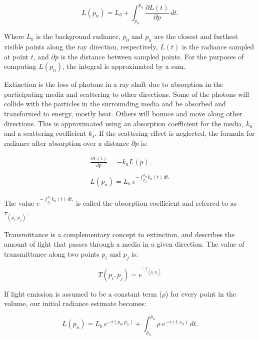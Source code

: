 \documentclass[oneside,a4paper,english,links]{amca}
\begin{document}
\begin{equation} \label{eq:general_radiance}  
  L(p_n) = L_b + \int_{p_0}^{p_n} \frac{\partial L(t)}{\partial p} \, dt.
\end{equation}

Where $L_b$ is the background radiance, $p_0$ and $p_n$ are the
closest and furthest visible points along the ray direction,
respectively, $L(t)$ is the radiance sampled at point $t$, and
$\partial p$ is the distance between sampled points. For the purposes
of computing $L(p_n)$, the integral is approximated by a sum.

Extinction is the loss of photons in a ray shaft due to absorption in
the participating media and scattering to other directions. Some of
the photons will collide with the particles in the
surrounding media and be absorbed and transformed to energy, mostly
heat. Others will bounce and move along other directions. This is
approximated using an absorption coefficient for the media, $k_a$ and
a scattering coefficient $k_s$. If the scattering effect is neglected,
the formula for radiance after absorption over a distance $\partial p$
is:

\begin{equation} \label{eq:absorption_radiance}  
  \begin{aligned}
    \frac{\partial L(t)}{\partial p} = -k_a L(p). 
    \\
    \\
    L(p_n) = L_b \ e^{-\int_{p_0}^{p_n} k_a(t) \, dt.}
  \end{aligned}
\end{equation}

The value $e^{-\int_{p_i}^{p_j} k_a(t) \, dt.}$ is called the
absorption coefficient and referred to as $\tau_{(p_i, p_j)}$.

Transmittance is a complementary concept to extinction, and describes
the amount of light that passes through a media in a given
direction. The value of transmittance along two points $p_i$ and $p_j$
is:

\begin{equation} \label{eq:general_radiance}  
  T(p_i,p_j) = e^{-\tau_{(p_i, p_j)}}
\end{equation}

If light emission is assumed to be a constant term ($\rho$) for
every point in the volume, our initial radiance estimate becomes:

\begin{equation} \label{eq:ray_radiance}  
  L(p_n) = L_b \ e^{-\tau(p_0, p_n)} + \int_{p_0}^{p_n} \rho \ e^{-\tau(t,s_n)} \, dt.
\end{equation}
\end{document}
